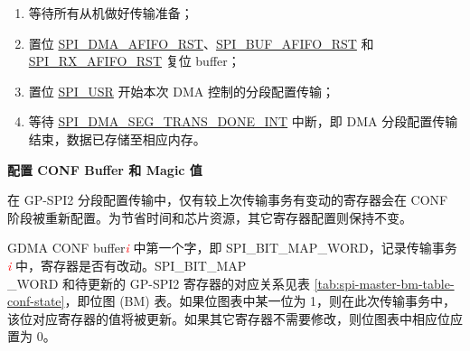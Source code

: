 \documentclass[main\_\_CN.tex]{subfiles}
\begin{document}
\begin{enumerate}
   \item 等待所有从机做好传输准备；

    \item 置位 \hyperref[fielddesc:SPIDMAAFIFORST]{SPI\_DMA\_AFIFO\_RST}、\hyperref[fielddesc:SPIBUFAFIFORST]{SPI\_BUF\_AFIFO\_RST} 和 \hyperref[fielddesc:SPIRXAFIFORST]{SPI\_RX\_AFIFO\_RST} 复位 buffer；

   \item 置位 \hyperref[fielddesc:SPIUSR]{SPI\_USR} 开始本次 DMA 控制的分段配置传输；

   \item 等待 \hyperref[int:SPIDMASEGTRANSDONEINT]{SPI\_DMA\_SEG\_TRANS\_DONE\_INT} 中断，即 DMA 分段配置传输结束，数据已存储至相应内存。
 \end{enumerate}

\textbf{配置 CONF Buffer 和 Magic 值}\label{other:spi-para-config-conf-buffer-magic-value}

在 GP-SPI2 分段配置传输中，仅有较上次传输事务有变动的寄存器会在 CONF 阶段被重新配置。为节省时间和芯片资源，其它寄存器配置则保持不变。

GDMA CONF buffer\textcolor{red}{\it i} 中第一个字，即 SPI\_BIT\_MAP\_WORD，记录传输事务 \textcolor{red}{\it i} 中，寄存器是否有改动。SPI\_BIT\_MAP\\\_WORD 和待更新的 GP-SPI2 寄存器的对应关系见表  \ref{tab:spi-master-bm-table-conf-state}，即位图 (BM) 表。如果位图表中某一位为 1，则在此次传输事务中，该位对应寄存器的值将被更新。如果其它寄存器不需要修改，则位图表中相应位应置为 0。
\end{document}

